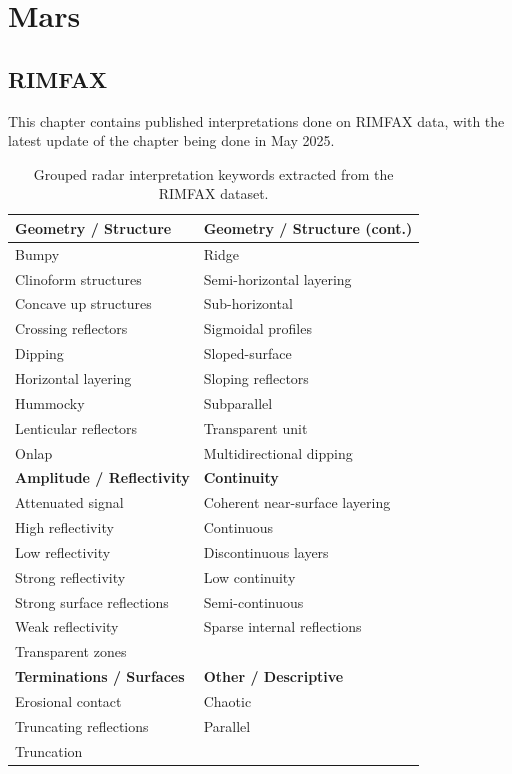 \clearpage
\section{Mars}
\subsection{RIMFAX}
This chapter contains published interpretations done on RIMFAX data, with the latest update of the chapter being done in May 2025. 

\begin{table}[h!]
\centering
\caption{Grouped radar interpretation keywords extracted from the RIMFAX dataset.}
\begin{tabular}{|p{6.8cm}|p{6.8cm}|}
\hline
\textbf{Geometry / Structure} & \textbf{Geometry / Structure (cont.)} \\
\hline
Bumpy & Ridge \\
Clinoform structures & Semi-horizontal layering \\
Concave up structures & Sub-horizontal \\
Crossing reflectors & Sigmoidal profiles \\
Dipping & Sloped-surface \\
Horizontal layering & Sloping reflectors \\
Hummocky & Subparallel \\
Lenticular reflectors & Transparent unit \\
Onlap & Multidirectional dipping \\
\hline
\textbf{Amplitude / Reflectivity} & \textbf{Continuity} \\
\hline
Attenuated signal & Coherent near-surface layering \\
High reflectivity & Continuous \\
Low reflectivity & Discontinuous layers \\
Strong reflectivity & Low continuity \\
Strong surface reflections & Semi-continuous \\
Weak reflectivity & Sparse internal reflections \\
Transparent zones & \\
\hline
\textbf{Terminations / Surfaces} & \textbf{Other / Descriptive} \\
\hline
Erosional contact & Chaotic \\
Truncating reflections & Parallel \\
Truncation & \\
\hline
\end{tabular}
\label{tab:rimfax-keywords}
\end{table}

